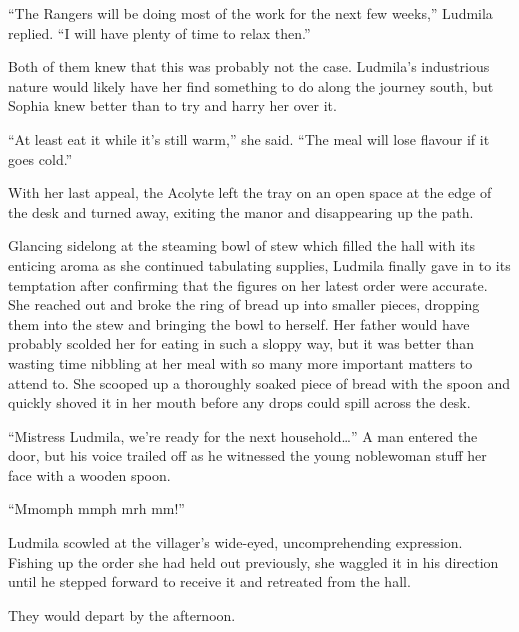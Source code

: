  

“The Rangers will be doing most of the work for the next few weeks,” Ludmila replied. “I will have plenty of time to relax then.”

 

Both of them knew that this was probably not the case. Ludmila’s industrious nature would likely have her find something to do along the journey south, but Sophia knew better than to try and harry her over it.

 

“At least eat it while it’s still warm,” she said. “The meal will lose flavour if it goes cold.”

 

With her last appeal, the Acolyte left the tray on an open space at the edge of the desk and turned away, exiting the manor and disappearing up the path.

 

Glancing sidelong at the steaming bowl of stew which filled the hall with its enticing aroma as she continued tabulating supplies, Ludmila finally gave in to its temptation after confirming that the figures on her latest order were accurate. She reached out and broke the ring of bread up into smaller pieces, dropping them into the stew and bringing the bowl to herself. Her father would have probably scolded her for eating in such a sloppy way, but it was better than wasting time nibbling at her meal with so many more important matters to attend to. She scooped up a thoroughly soaked piece of bread with the spoon and quickly shoved it in her mouth before any drops could spill across the desk.

 

“Mistress Ludmila, we’re ready for the next household…” A man entered the door, but his voice trailed off as he witnessed the young noblewoman stuff her face with a wooden spoon.

 

“Mmomph mmph mrh mm!”

 

Ludmila scowled at the villager’s wide-eyed, uncomprehending expression. Fishing up the order she had held out previously, she waggled it in his direction until he stepped forward to receive it and retreated from the hall.

 

They would depart by the afternoon.